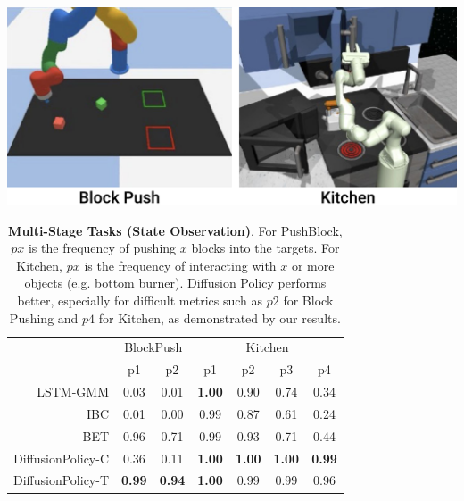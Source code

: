 \documentclass[Afour,sageh,times]{sagej}
\begin{document}
\begin{table}[t]
\centering
\includegraphics[width=0.9\linewidth]{figure/multitask_thumbnails.pdf}

\vspace{2mm}



\setlength\tabcolsep{4.8 pt}
\begin{tabular}{r|cc|cccc}
\toprule
 & \multicolumn{2}{c|}{BlockPush} & \multicolumn{4}{c}{Kitchen} \\
 & p1 & p2 & p1 & p2 & p3 & p4 \\
\midrule
LSTM-GMM & \small 0.03 & \small 0.01 & \small \textbf{1.00} & \small 0.90 & \small 0.74 & \small 0.34 \\
IBC & \small 0.01 & \small 0.00 & \small 0.99 & \small 0.87 & \small 0.61 & \small 0.24 \\
BET & \small 0.96 & \small 0.71 & \small 0.99 & \small 0.93 & \small 0.71 & \small 0.44 \\
DiffusionPolicy-C & \small 0.36 & \small 0.11 & \small \textbf{1.00} & \small \textbf{1.00} & \small \textbf{1.00} & \small \textbf{0.99} \\
DiffusionPolicy-T & \small \textbf{0.99} & \small \textbf{0.94} & \small \textbf{1.00} & \small 0.99 & \small 0.99 & \small 0.96 \\
\bottomrule
\end{tabular}
\caption{\textbf{Multi-Stage Tasks (State Observation)}.
\label{tab:multi_stage}
For PushBlock, $px$ is the frequency of pushing $x$ blocks into the targets.
For Kitchen, $px$ is the frequency of interacting with $x$ or more objects (e.g. bottom burner).
Diffusion Policy performs better, especially for difficult metrics such as $p2$ for Block Pushing and $p4$ for Kitchen, as demonstrated by our results.
}
\vspace{-4mm}
\end{table}
\end{document}
